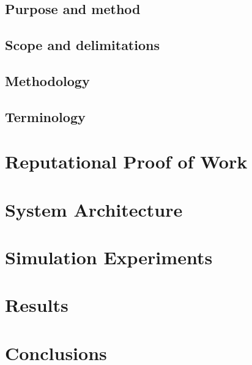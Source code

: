 \documentclass[a4paper,11pt]{kth-mag}
\begin{document}
\subsection*{Purpose and method}

\subsection*{Scope and delimitations}

\subsection*{Methodology}

\subsection*{Terminology}


\section{Reputational Proof of Work}

\newpage
\section{System Architecture}

\newpage
\section{Simulation Experiments}

\section{Results}

\section{Conclusions}

\
\begin{comment}
\begin{figure}[ht]
\begin{center}
And here is a figure 
\caption{\small{Several statements describing the same resource.}}\label{RDF_4}
\end{center}
\end{figure}


that we refer to here: \ref{RDF_4}
\end{comment}
\printbibliography
\end{document}
